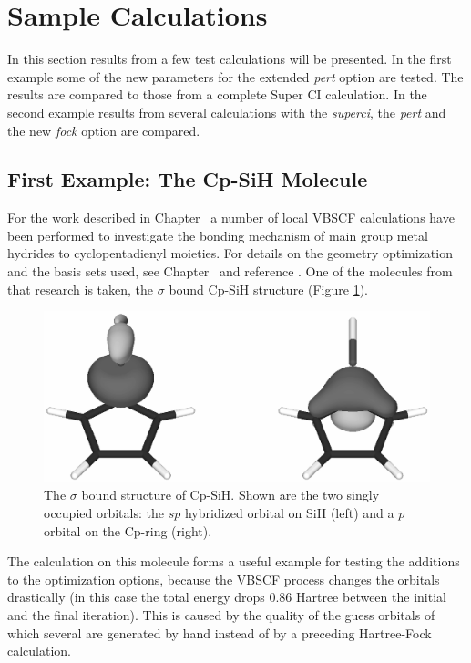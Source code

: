 \section{Sample Calculations}

In this section results from a few test calculations will be presented. In the first example some of the new parameters for the extended \textit{pert} option are tested. The results are compared to those from a complete Super CI calculation. In the second example results from several calculations with the \textit{superci}, the \textit{pert} and the new \textit{fock} option are compared.  

\subsection{\label{ch2.sec.cyclopent}First Example: The Cp-SiH Molecule}

For the work described in Chapter \chcyclopentadienyl\ a number of local VBSCF calculations have been performed to investigate the bonding mechanism of main group metal hydrides to cyclopentadienyl moieties. For details on the geometry optimization and the basis sets used, see Chapter \chcyclopentadienyl\ and reference \cite{budzelaar}. One of the molecules from that research is taken, the $\sigma$ bound \mbox{Cp-SiH} structure (Figure \ref{fig.cpsih}).
\begin{figure}[htdp]
\center
\includegraphics[scale=0.6]{orbopt/figures/sigma_sih.eps}
\caption{The $\sigma$ bound structure of Cp-SiH. Shown are the two singly occupied orbitals: the $sp$ hybridized orbital on SiH (left) and a $p$ orbital on the Cp-ring (right).}
\label{fig.cpsih}
\end{figure}
The calculation on this molecule forms a useful example for testing the additions to the optimization options, because the VBSCF process changes the orbitals drastically (in this case the total energy drops 0.86 Hartree between the initial and the final iteration). This is caused by the quality of the guess orbitals of which several are generated by hand instead of by a preceding Hartree-Fock calculation.

